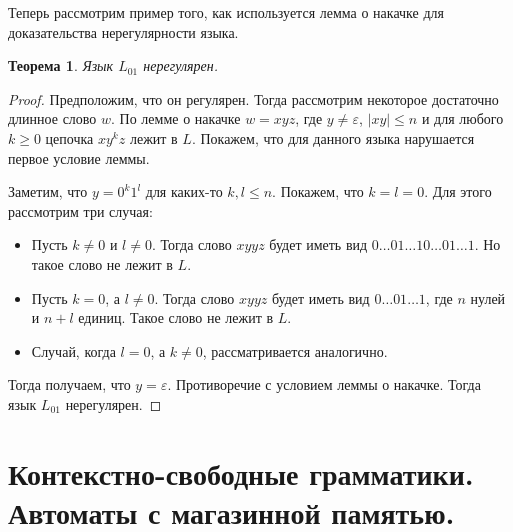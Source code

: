 \documentclass[a4paper,12pt]{article}
\newtheorem*{theorem}{Теорема}
\begin{document}
	Теперь рассмотрим пример того, как используется лемма о накачке для доказательства нерегулярности языка. 
	\begin{theorem}
		Язык \(L_{01}\) нерегулярен.
	\end{theorem}
	\begin{proof}
		Предположим, что он регулярен. Тогда рассмотрим некоторое достаточно длинное слово \(w\). По лемме о накачке \(w = xyz\), где \(y \neq \varepsilon\), \(|xy| \leqslant n\) и для любого \(k \geqslant 0\) цепочка \(xy^kz\) лежит в \(L\). Покажем, что для данного языка нарушается первое условие леммы.
		
		Заметим, что \(y = 0^k1^l\) для каких-то \(k, l \leqslant n\). Покажем, что \(k = l = 0\). Для этого рассмотрим три случая:
		\begin{itemize}
			\item Пусть \(k \neq 0\) и \(l \neq 0\). Тогда слово \(xyyz\) будет иметь вид \(0\ldots01\ldots10\ldots01\ldots1\). Но такое слово не лежит в \(L\).
			\item Пусть \(k = 0\), а \(l \neq 0\). Тогда слово \(xyyz\) будет иметь вид \(0\ldots01\ldots1\), где \(n\) нулей и \(n + l\) единиц. Такое слово не лежит в \(L\).
			\item Случай, когда \(l = 0\), а \(k \neq 0\), рассматривается аналогично.
		\end{itemize}
		Тогда получаем, что \(y = \varepsilon\). Противоречие с условием леммы о накачке. Тогда язык \(L_{01}\) нерегулярен.
	\end{proof}
\newpage
	\section{Контекстно-свободные грамматики. Автоматы с магазинной памятью.}
\end{document}
